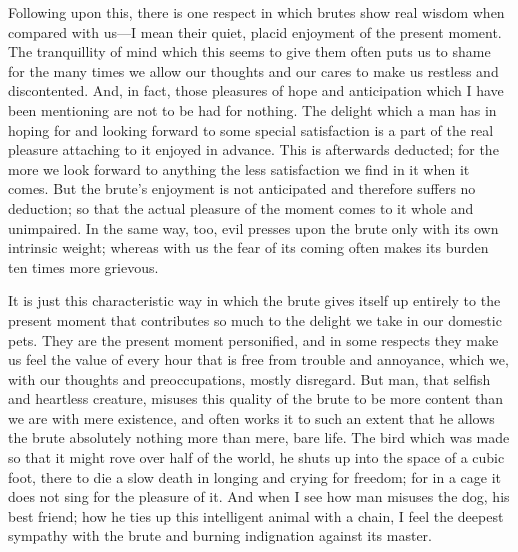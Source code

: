 Following upon this, there is one respect in which brutes show real
wisdom when compared with us---I mean their quiet, placid enjoyment of
the present moment. The tranquillity of mind which this seems to give
them often puts us to shame for the many times we allow our thoughts
and our cares to make us restless and discontented. And, in fact,
those pleasures of hope and anticipation which I have been mentioning
are not to be had for nothing. The delight which a man has in hoping
for and looking forward to some special satisfaction is a part of the
 real pleasure attaching to it enjoyed in advance. This is
afterwards deducted; for the more we look forward to anything the less
satisfaction we find in it when it comes. But the brute's enjoyment is
not anticipated and therefore suffers no deduction; so that the actual
pleasure of the moment comes to it whole and unimpaired. In the same
way, too, evil presses upon the brute only with its own intrinsic
weight; whereas with us the fear of its coming often makes its burden
ten times more grievous.

It is just this characteristic way in which the brute gives itself up
entirely to the present moment that contributes so much to the delight
we take in our domestic pets. They are the present moment personified,
and in some respects they make us feel the value of every hour that is
free from trouble and annoyance, which we, with our thoughts and
preoccupations, mostly disregard. But man, that selfish and heartless
creature, misuses this quality of the brute to be more content than we
are with mere existence, and often works it to such an extent that he
allows the brute absolutely nothing more than mere, bare life. The
bird which was made so that it might rove over half of the world, he
shuts up into the space of a cubic foot, there to die a slow death in
longing and crying for freedom; for in a cage it does not sing for the
pleasure of it. And when I see how man misuses the dog, his best
friend; how he ties up this intelligent animal with a chain, I feel
the deepest sympathy with the brute and burning indignation against
its master.


